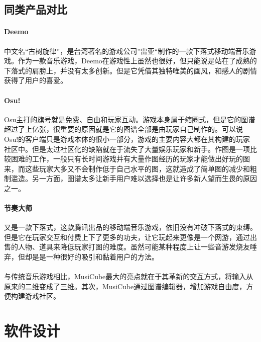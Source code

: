 \documentclass{article}
\begin{document}
\subsection{同类产品对比}
\paragraph{Deemo}
中文名“古树旋律”，是台湾著名的游戏公司”雷亚“制作的一款下落式移动端音乐游戏。作为一款音乐游戏，Deemo在游戏性上虽然也很好，但只能说是站在了成熟的下落式的肩膀上，并没有太多创新。但是它凭借其独特唯美的画风，和感人的剧情获得了用户的喜爱。
\paragraph{Osu!}
Osu主打的旗号就是免费、自由和玩家互动。游戏本身属于缩圈式，但是它的图谱超过了上亿张，很重要的原因就是它的图谱全部是由玩家自己制作的。可以说Osu!的客户端只是游戏本体的很小一部分，游戏的主要内容大都在其构建的玩家社区中。但是太过社区化的缺陷就在于流失了大量娱乐玩家和新手。作图是一项比较困难的工作，一般只有长时间游戏并有大量作图经历的玩家才能做出好玩的图来，而这些玩家大多又不会制作低于自己水平的图，这就造成了简单图的减少和粗制滥造。另一方面，图谱太多让新手用户难以选择也是让许多新人望而生畏的原因之一。
\paragraph{节奏大师}
又是一款下落式，这款腾讯出品的移动端音乐游戏，依旧没有冲破下落式的束缚。但是它在玩家交互和付费上下了更多的功夫，让它玩起来更像是一个网游，通过出售的人物、道具来降低玩家打图的难度。虽然可能某种程度上让一些音游发烧友唾弃，但却是是一种很好的吸引和黏着用户的方法。
\paragraph{}
与传统音乐游戏相比，MusiCube最大的亮点就在于其革新的交互方式，将输入从原来的二维变成了三维。其次，MusiCube通过图谱编辑器，增加游戏自由度，方便构建游戏社区。
\section{软件设计}
\end{document}
